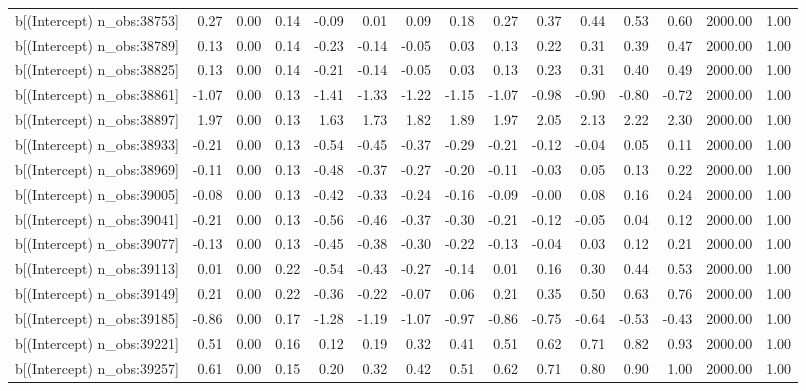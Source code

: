 \begin{table}[ht]
\begin{tabular}{rrrrrrrrrrrrrrr}
  b[(Intercept) n\_obs:38753] & 0.27 & 0.00 & 0.14 & -0.09 & 0.01 & 0.09 & 0.18 & 0.27 & 0.37 & 0.44 & 0.53 & 0.60 & 2000.00 & 1.00 \\ 
  b[(Intercept) n\_obs:38789] & 0.13 & 0.00 & 0.14 & -0.23 & -0.14 & -0.05 & 0.03 & 0.13 & 0.22 & 0.31 & 0.39 & 0.47 & 2000.00 & 1.00 \\ 
  b[(Intercept) n\_obs:38825] & 0.13 & 0.00 & 0.14 & -0.21 & -0.14 & -0.05 & 0.03 & 0.13 & 0.23 & 0.31 & 0.40 & 0.49 & 2000.00 & 1.00 \\ 
  b[(Intercept) n\_obs:38861] & -1.07 & 0.00 & 0.13 & -1.41 & -1.33 & -1.22 & -1.15 & -1.07 & -0.98 & -0.90 & -0.80 & -0.72 & 2000.00 & 1.00 \\ 
  b[(Intercept) n\_obs:38897] & 1.97 & 0.00 & 0.13 & 1.63 & 1.73 & 1.82 & 1.89 & 1.97 & 2.05 & 2.13 & 2.22 & 2.30 & 2000.00 & 1.00 \\ 
  b[(Intercept) n\_obs:38933] & -0.21 & 0.00 & 0.13 & -0.54 & -0.45 & -0.37 & -0.29 & -0.21 & -0.12 & -0.04 & 0.05 & 0.11 & 2000.00 & 1.00 \\ 
  b[(Intercept) n\_obs:38969] & -0.11 & 0.00 & 0.13 & -0.48 & -0.37 & -0.27 & -0.20 & -0.11 & -0.03 & 0.05 & 0.13 & 0.22 & 2000.00 & 1.00 \\ 
  b[(Intercept) n\_obs:39005] & -0.08 & 0.00 & 0.13 & -0.42 & -0.33 & -0.24 & -0.16 & -0.09 & -0.00 & 0.08 & 0.16 & 0.24 & 2000.00 & 1.00 \\ 
  b[(Intercept) n\_obs:39041] & -0.21 & 0.00 & 0.13 & -0.56 & -0.46 & -0.37 & -0.30 & -0.21 & -0.12 & -0.05 & 0.04 & 0.12 & 2000.00 & 1.00 \\ 
  b[(Intercept) n\_obs:39077] & -0.13 & 0.00 & 0.13 & -0.45 & -0.38 & -0.30 & -0.22 & -0.13 & -0.04 & 0.03 & 0.12 & 0.21 & 2000.00 & 1.00 \\ 
  b[(Intercept) n\_obs:39113] & 0.01 & 0.00 & 0.22 & -0.54 & -0.43 & -0.27 & -0.14 & 0.01 & 0.16 & 0.30 & 0.44 & 0.53 & 2000.00 & 1.00 \\ 
  b[(Intercept) n\_obs:39149] & 0.21 & 0.00 & 0.22 & -0.36 & -0.22 & -0.07 & 0.06 & 0.21 & 0.35 & 0.50 & 0.63 & 0.76 & 2000.00 & 1.00 \\ 
  b[(Intercept) n\_obs:39185] & -0.86 & 0.00 & 0.17 & -1.28 & -1.19 & -1.07 & -0.97 & -0.86 & -0.75 & -0.64 & -0.53 & -0.43 & 2000.00 & 1.00 \\ 
  b[(Intercept) n\_obs:39221] & 0.51 & 0.00 & 0.16 & 0.12 & 0.19 & 0.32 & 0.41 & 0.51 & 0.62 & 0.71 & 0.82 & 0.93 & 2000.00 & 1.00 \\ 
  b[(Intercept) n\_obs:39257] & 0.61 & 0.00 & 0.15 & 0.20 & 0.32 & 0.42 & 0.51 & 0.62 & 0.71 & 0.80 & 0.90 & 1.00 & 2000.00 & 1.00 \\ 

\end{tabular}
\end{table}
